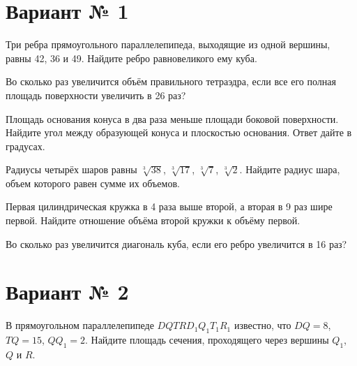 \documentclass[4apaper]{article}
\begin{document}
\newpage\section*{Вариант № 1}

\begin{taskBN}{1}
Три ребра прямоугольного параллелепипеда, выходящие из одной вершины, равны 42, 36 и 49. Найдите ребро равновеликого ему куба.
\end{taskBN}

\begin{taskBN}{2}
Во сколько раз увеличится объём правильного тетраэдра, если все его полная площадь поверхности увеличить в 26 раз?
\end{taskBN}

\begin{taskBN}{3}
Площадь основания конуса в два раза меньше площади боковой поверхности. Найдите угол между образующей конуса и плоскостью основания. Ответ дайте в градусах.
\end{taskBN}

\begin{taskBN}{4}
Радиусы четырёх шаров равны $\sqrt[3]{38}$, $\sqrt[3]{17}$, $\sqrt[3]{7}$, $\sqrt[3]{2}$. Найдите радиус шара, объем которого равен сумме их объемов.
\end{taskBN}

\begin{taskBN}{5}
 Первая цилиндрическая кружка в 4 раза выше второй, а вторая в 9 раз шире первой. Найдите отношение объёма второй кружки к объёму первой.
\end{taskBN}

\begin{taskBN}{6}
Во сколько раз увеличится диагональ куба, если его ребро увеличится в 16 раз?
\end{taskBN}

\newpage\section*{Вариант № 2}

\begin{taskBN}{1}
В прямоугольном параллелепипеде  $DQTRD_{1}Q_{1}T_{1}R_{1}$  известно, что  $DQ = 8$, $TQ = 15$, $QQ_{1} = 2$. Найдите площадь сечения, проходящего через вершины $Q_{1}$, $Q$ и $R$.
\end{taskBN}
\end{document}
